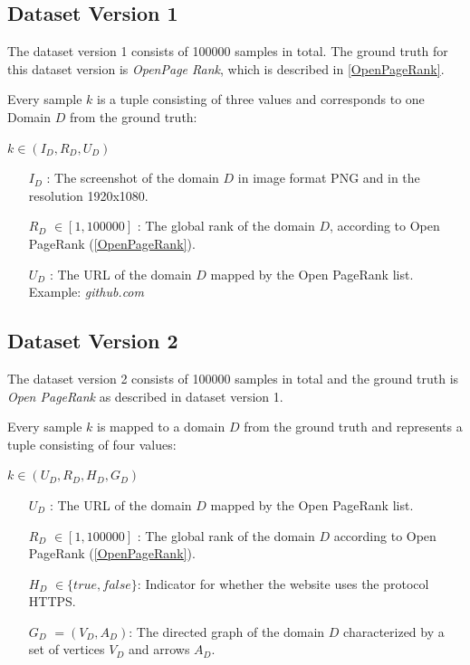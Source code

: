 \documentclass{article}
\begin{document}
\subsection{Dataset Version 1}
\label{DatasetVersion1}
The dataset version 1 consists of 100000 samples in total. The ground truth for this dataset version is \textit{OpenPage Rank}, which is described in \ref{OpenPageRank}.

Every sample $k$ is a tuple consisting of three values and corresponds to one Domain $D$ from the ground truth:

\begin{center}
 $ k \in (I_D, R_D, U_D)$
\begin{itemize}
	\item[$I_D$]: The screenshot of the domain $D$ in image format PNG and in the resolution 1920x1080.
	\item[$R_D$] $\in [1, 100000]$ : The global rank of the domain $D$, according to Open PageRank (\ref{OpenPageRank}). 
	\item[$U_D$]: The URL of the domain $D$ mapped by the Open PageRank list. Example: \textit{github.com}
\end{itemize}
\end{center}

\subsection{Dataset Version 2}
\label{DatasetVersion2}
The dataset version 2 consists of 100000 samples in total and the ground truth is \textit{Open PageRank} as described in dataset version 1.

Every sample $k$ is mapped to a domain $D$ from the ground truth and represents a tuple consisting of four values:

\begin{center}
$k \in (U_D,R_D,H_D,G_D)$
\begin{itemize}
	 \item[$U_D$]: The URL of the domain $D$ mapped by the Open PageRank list.
	\item[$R_D$] $\in [1, 100000]$ : The global rank of the domain $D$ according to Open PageRank (\ref{OpenPageRank}). 
    \item[$H_D$] $\in \{true, false\}$: Indicator for whether the website uses the protocol HTTPS.
    \item[$G_D$] $= (V_D, A_D)$: The directed graph of the domain $D$ characterized by a set of vertices $V_D$ and arrows $A_D$.
\end{itemize}
\end{center}
\end{document}
